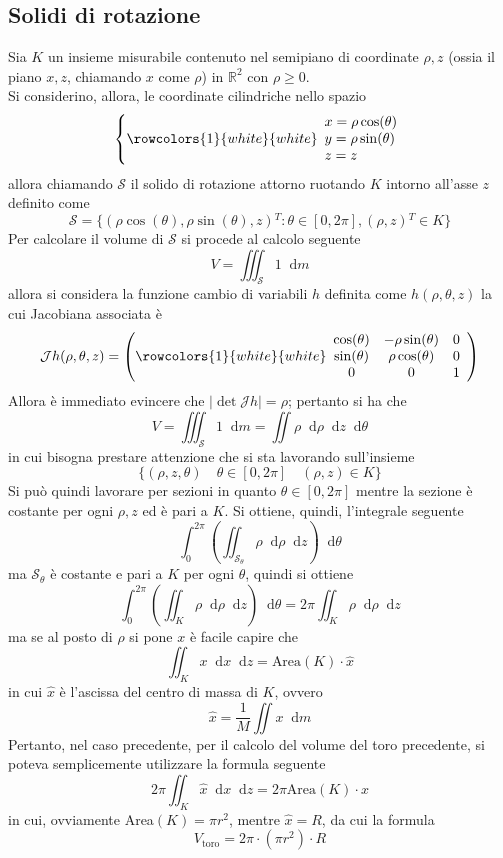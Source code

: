 \documentclass[a4paper]{extarticle}
\newcommand*\dif{\mathop{}\!\mathrm{d}}
\begin{document}
\subsection{Solidi di rotazione}
Sia $K$ un insieme misurabile contenuto nel semipiano di coordinate $\rho,z$ (ossia il piano $x,z$, chiamando $x$ come $\rho$) in $\mathbb{R}^2$ con $\rho \geq 0$.\\
Si considerino, allora, le coordinate cilindriche nello spazio
\[
    \left\{
    \rowcolors{1}{white}{white}
    \begin{array}{l}
        x=\rho \cos(\theta)\\
        y=\rho \sin(\theta)\\
        z=z
    \end{array}
    \right.
\]
allora chiamando $\mathcal{S}$ il solido di rotazione attorno ruotando $K$ intorno all'asse $z$ definito come
\[\mathcal{S} = \{\left(\rho \cos(\theta), \rho \sin(\theta), z\right){^T} : \theta \in [0,2\pi], (\rho,z){^T} \in K\}\]
Per calcolare il volume di $\mathcal{S}$ si procede al calcolo seguente
\[V=\iiint_\mathcal{S} 1 \dif m\]
allora si considera la funzione cambio di variabili $h$ definita come $h(\rho,\theta,z)$ la cui Jacobiana associata è
\[
    \mathcal{J} h(\rho,\theta,z) = \left(
    \rowcolors{1}{white}{white}
    \begin{array}{ccc}
        \cos(\theta) & -\rho \sin(\theta) & 0\\
        \sin(\theta) & \rho \cos(\theta) & 0\\
        0 & 0 & 1\\
    \end{array}
    \right)
\]
Allora è immediato evincere che $\vert \det \mathcal{J} h \vert = \rho$; pertanto si ha che
\[V=\iiint_\mathcal{S} 1 \dif m=\iint \rho \dif \rho \dif z \dif \theta\]
in cui bisogna prestare attenzione che si sta lavorando sull'insieme
\[\{(\rho,z,\theta) \hspace{1em} \theta \in [0,2\pi] \hspace{1em} (\rho,z) \in K\}\]
Si può quindi lavorare per sezioni in quanto $\theta \in [0,2\pi]$ mentre la sezione è costante per ogni $\rho,z$ ed è pari a $K$. Si ottiene, quindi, l'integrale seguente
\[\int_0^{2\pi} \left(\iint_{\mathcal{S}_\theta} \rho \dif \rho \dif z\right) \dif \theta\]
ma $\mathcal{S}_\theta$ è costante e pari a $K$ per ogni $\theta$, quindi si ottiene
\[\int_0^{2\pi} \left(\iint_{K} \rho \dif \rho \dif z\right) \dif \theta = 2 \pi \iint_K \rho \dif \rho \dif z\]
ma se al posto di $\rho$ si pone $x$ è facile capire che
\[\iint_K x \dif x \dif z = \text{Area} (K) \cdot \hat x\]
in cui $\hat x$ è l'ascissa del centro di massa di $K$, ovvero
\[\hat x = \dfrac{1}{M} \iint x \dif m\]
Pertanto, nel caso precedente, per il calcolo del volume del toro precedente, si poteva semplicemente utilizzare la formula seguente
\[\boxed{2 \pi \iint_K \hat x \dif x \dif z = 2 \pi \text{Area}(K) \cdot \hat x}\]
in cui, ovviamente Area$(K)=\pi r^2$, mentre $\hat x = R$, da cui la formula
\[V_{\text{toro}} = 2 \pi \cdot (\pi r^2) \cdot R\]
\end{document}
